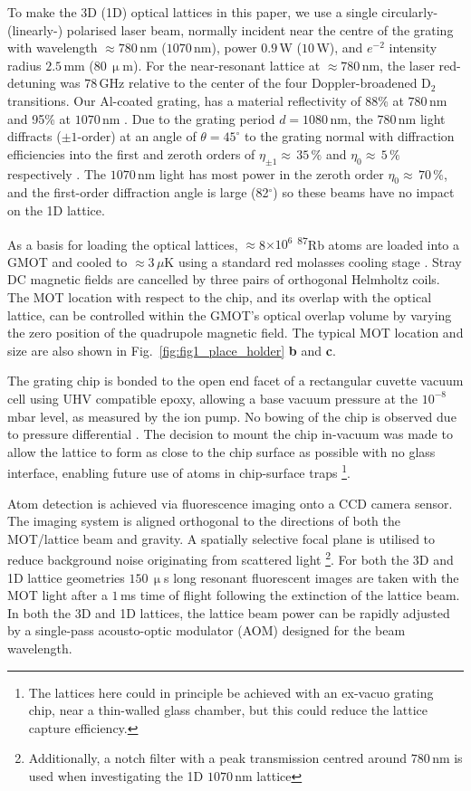 \documentclass[aps,prl,floatfix,showpacs,twocolumn,amsmath,amssymb,superscriptaddress]{revtex4-2}
\begin{document}
To make the 3D (1D) optical lattices in this paper, we use a single circularly- (linearly-) polarised  laser beam, normally incident near the centre of the grating with wavelength $\approx 780\,$nm ($1070\,$nm),  power $0.9\,$W ($10\,$W), and $e^{-2}$ intensity radius
$2.5\,$mm ($80\,\upmu$m). For the near-resonant lattice at $\approx 780\,$nm, the laser red-detuning was $78\,$GHz relative to the center of the four Doppler-broadened D$_2$ transitions. Our Al-coated grating, has a material reflectivity of 88\% at $780\,$nm and 95\% at $1070\,$nm \cite{Handbook_of_Optical_materials}. Due to the grating period $d=1080\,$nm, the $780\,$nm light diffracts ($\pm 1$-order) at an angle of $\theta=45^\circ$ to the grating normal with diffraction efficiencies into the first and zeroth orders of $\eta_{\pm1}\approx\,35\,\%$ and  $\eta_{0}\approx\,5\,\%$ respectively \cite{McGilligan2016}. The $1070\,$nm light has most power in the zeroth order $\eta_{0}\approx\,70\,\%$, and the first-order diffraction angle is  large (82$^\circ$) so these beams have no impact on the 1D lattice.

As a basis for loading the optical lattices, $\approx$8$\times10^{6}$ \textsuperscript{87}Rb atoms are loaded into a GMOT and cooled to $\approx$3$\,\mu$K using a standard red molasses cooling stage \cite{GMOT1_Nshii2013,GMOT2_McGilligan2017}. Stray DC magnetic fields are cancelled by three pairs of orthogonal Helmholtz coils. The MOT location with respect to the chip, and its overlap with the optical lattice, can be controlled within the GMOT's optical overlap volume by varying the zero position of the quadrupole magnetic field.
The typical MOT location and size are also shown in Fig.~\ref{fig:fig1_place_holder} \textbf{b} and \textbf{c}.

The grating chip is bonded to the open end facet of a rectangular cuvette vacuum cell using UHV compatible epoxy, allowing a base vacuum pressure at the $10^{-8}\,$mbar level, as measured by the ion pump. No bowing of the chip is observed due to pressure differential
\cite{Atom_chip_vacuumSquires2016}. The decision to mount the chip in-vacuum was made to allow the lattice to form as close to the chip surface as possible with no glass interface, enabling future use of atoms in chip-surface traps \footnote{The lattices here could in principle be achieved with an ex-vacuo grating chip, near a thin-walled glass chamber, but this could reduce the lattice capture efficiency.}.

Atom detection is achieved via fluorescence imaging onto a CCD camera sensor. The imaging system is aligned orthogonal to the directions of both the MOT/lattice beam and gravity.
A spatially selective focal plane is utilised to reduce background noise originating from scattered light \footnote{Additionally, a notch filter with a peak transmission centred around $780\,$nm is used when investigating the 1D $1070\,$nm lattice}. For both the 3D and 1D lattice geometries $150\,\upmu$s long resonant fluorescent images are taken with the MOT light after a $1\,$ms time of flight following the extinction of the lattice beam.
In both the 3D and 1D lattices, the lattice beam power can be rapidly adjusted by a single-pass acousto-optic modulator (AOM) designed for the beam wavelength.
\end{document}
